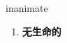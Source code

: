 
\begin{frame}
{\huge inanimate}
\begin{center}
\begin{enumerate}\Large
  \item \textbf{无生命的}
\end{enumerate}
\end{center}
\end{frame}
